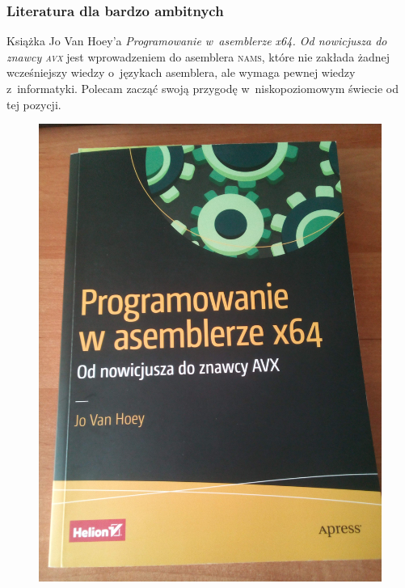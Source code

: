 \documentclass[10pt,t]{beamer}
\begin{document}
\begin{frame}
  \frametitle{Literatura dla bardzo ambitnych}


  Książka Jo Van Hoey’a \textit{Programowanie w~asemblerze x64. Od
    nowicjusza do znawcy \textsc{avx}} jest wprowadzeniem do asemblera
  \textsc{nams}, które nie zakłada żadnej wcześniejszy wiedzy o~językach
  asemblera, ale wymaga pewnej wiedzy z~informatyki. Polecam zacząć
  swoją przygodę w~niskopoziomowym świecie od tej pozycji.




  \begin{figure}

    \centering

    \includegraphics[scale=0.0325]
    {./Presentations-pictures/Programowanie-w-x64.jpg}

  \end{figure}

\end{frame}
\end{document}

